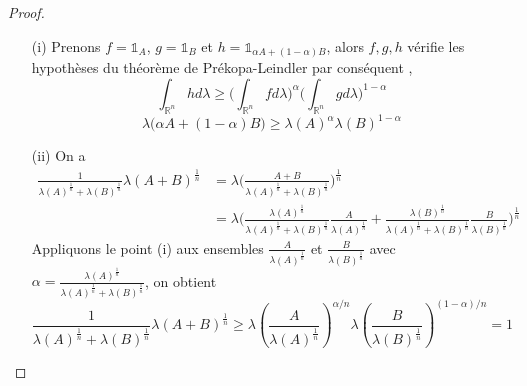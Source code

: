 \documentclass[12pt]{article}
\theoremstyle{definition}
\begin{document}
\begin{proof}
	\begin{enumerate}
		\item[(i)] Prenons $f=\mathbb{1}_A$, $g=\mathbb{1}_B$ et $h=\mathbb{1}_{\alpha A+(1-\alpha)B}$, alors $f,g,h$ vérifie les hypothèses du théorème de Prékopa-Leindler par conséquent ,
		\begin{equation*}
		\int_{\mathbb{R}^n}hd\lambda \geq \Big(\int_{\mathbb{R}^n}fd\lambda\Big)^{\alpha} \Big(\int_{\mathbb{R}^n}gd\lambda\Big)^{1-\alpha}
		\end{equation*}
		\begin{equation*}
		\lambda\big(\alpha A+(1-\alpha)B\big) \geq \lambda(A)^{\alpha} \lambda(B)^{1-\alpha}
		\end{equation*}
		\item[(ii)] On a
		\begin{align*}
		\frac{1}{\lambda(A)^{\frac{1}{n}}+\lambda(B)^{\frac{1}{n}}}\lambda(A+B)^{\frac{1}{n}}&=\lambda\Big(\frac{A+B}{\lambda(A)^{\frac{1}{n}}+\lambda(B)^{\frac{1}{n}}}\Big)^{\frac{1}{n}}\\
		&=\lambda\Big(\frac{\lambda(A)^\frac{1}{n}}{\lambda(A)^{\frac{1}{n}}+\lambda(B)^{\frac{1}{n}}}\frac{A}{\lambda(A)^\frac{1}{n}}+\frac{\lambda(B)^\frac{1}{n}}{\lambda(A)^{\frac{1}{n}}+\lambda(B)^{\frac{1}{n}}}\frac{B}{\lambda(B)^\frac{1}{n}}\Big)^\frac{1}{n}
		\end{align*}
		Appliquons le point (i) aux ensembles $\frac{A}{\lambda(A)^{\frac{1}{n}}}$ et $\frac{B}{\lambda(B)^{\frac{1}{n}}}$ avec $\alpha = \frac{\lambda(A)^\frac{1}{n}}{\lambda(A)^{\frac{1}{n}}+\lambda(B)^{\frac{1}{n}}}$, on obtient 
		\begin{equation*}
		\frac{1}{\lambda(A)^{\frac{1}{n}}+\lambda(B)^{\frac{1}{n}}}\lambda(A+B)^{\frac{1}{n}}\geq \lambda\left(\frac{A}{\lambda(A)^\frac{1}{n}}\right)^{\alpha/n} \lambda\left(\frac{B}{\lambda(B)^\frac{1}{n}}\right)^{(1-\alpha)/n}=1
		\end{equation*}
	\end{enumerate}
\end{proof}
\end{document}
